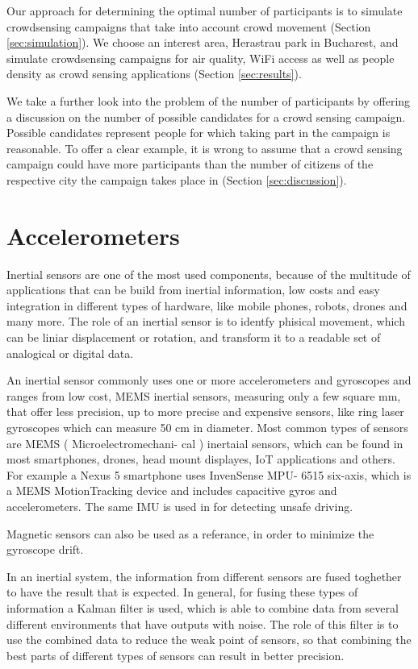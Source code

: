 Our approach for determining the optimal number of participants is to simulate crowdsensing campaigns that take into account crowd movement (Section \ref{sec:simulation}). We choose an interest area, Herastrau park in Bucharest, and simulate crowdsensing campaigns for air quality, WiFi access as well as people density as crowd sensing applications (Section \ref{sec:results}).

We take a further look into the problem of the number of participants by offering a discussion on the number of possible candidates for a crowd sensing campaign. Possible candidates represent people for which taking part in the campaign is reasonable. To offer a clear example, it is wrong to assume that a crowd sensing campaign could have more participants than the number of citizens of the respective city the campaign takes place in (Section \ref{sec:discussion}).


\section{Accelerometers}
\label{sec:intro-acc}
Inertial sensors are one of the most used components,
because of the multitude of applications that can be build from
inertial information, low costs and easy integration in different
types of hardware, like mobile phones, robots, drones and
many more. The role of an inertial sensor is to identfy phisical
movement, which can be liniar displacement or rotation, and
transform it to a readable set of analogical or digital data.

An inertial sensor commonly uses one or more accelerometers
 and gyroscopes and ranges from low cost, MEMS inertial
sensors, measuring only a few square mm, that offer less
precision, up to more precise and expensive sensors, like ring
laser gyroscopes which can measure 50 cm in diameter. Most
common types of sensors are MEMS ( Microelectromechani-
cal ) inertaial sensors, which can be found in most smartphones,
drones, head mount displayes, IoT applications and others.
For example a Nexus 5 smartphone uses InvenSense MPU-
6515 six-axis, which is a MEMS MotionTracking device and
includes capacitive gyros and accelerometers. The same IMU
is used in \cite{Liu-2015} for detecting unsafe driving. 

Magnetic sensors
can also be used as a referance, in order to minimize the
gyroscope drift.

In an inertial system, the information from different sensors
are fused toghether to have the result that is expected. In
general, for fusing these types of information a Kalman filter
is used, which is able to combine data from several different
environments that have outputs with noise. The role of this
filter is to use the combined data to reduce the weak point of
sensors, so that combining the best parts of different types of
sensors can result in better precision.
